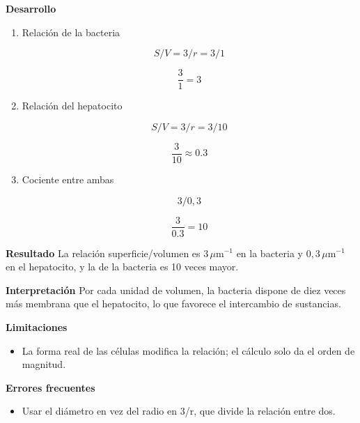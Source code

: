 \documentclass{book}
\begin{document}
\begin{tcolorbox}[title={Problema resuelto}, studiumworked, breakable]
\begin{enumerate}
\end{enumerate}

\noindent\textbf{Desarrollo}
\begin{enumerate}
\item
Relación de la bacteria


\[
S/V = 3/r = 3/1
\]

\[
\frac{3}{1} = 3
\]
\item
Relación del hepatocito


\[
S/V = 3/r = 3/10
\]

\[
\frac{3}{10} \approx 0.3
\]
\item
Cociente entre ambas


\[
3 / 0{,}3
\]

\[
\frac{3}{0.3} = 10
\]
\end{enumerate}

\noindent\textbf{Resultado}
La relación superficie/volumen es \(3\,\mu\mathrm{m}^{-1}\) en la bacteria y \(0{,}3\,\mu\mathrm{m}^{-1}\) en el hepatocito, y la de la bacteria es 10 veces mayor.


\noindent\textbf{Interpretación}
Por cada unidad de volumen, la bacteria dispone de diez veces más membrana que el hepatocito, lo que favorece el intercambio de sustancias.


\noindent\textbf{Limitaciones}
\begin{itemize}
\item La forma real de las células modifica la relación; el cálculo solo da el orden de magnitud.
\end{itemize}

\noindent\textbf{Errores frecuentes}
\begin{itemize}
\item Usar el diámetro en vez del radio en 3/r, que divide la relación entre dos.
\end{itemize}
\end{tcolorbox}
\end{document}
